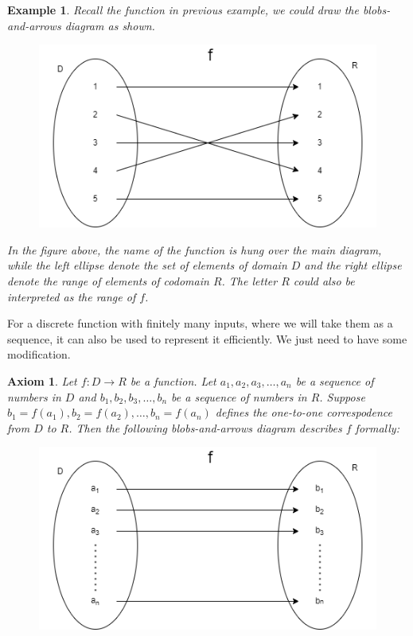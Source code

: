 \documentclass[12pt]{article}
\newtheorem*{example}{Example}
\newtheorem*{axiom}{Axiom}
\begin{document}
    \begin{example}
        Recall the function in previous example, we could draw the blobs-and-arrows diagram as shown. 

        \begin{figure}[H]
            \centering
            \includegraphics[scale=0.6]{blobs-and-arrows diagram.png}
        \end{figure}

        In the figure above, the name of the function is hung over the main diagram, while the left ellipse denote the set of elements of domain $D$ and the right ellipse denote the range of elements of codomain $R$. The letter $R$ could also be interpreted as the range of $f$.
    \end{example}

    For a discrete function with finitely many inputs, where we will take them as a sequence, it can also be used to represent it efficiently. We just need to have some modification.

    \begin{axiom}
        Let $f:D\to R$ be a function. Let $a_1,a_2,a_3,\dots,a_n$ be a sequence of numbers in $D$ and $b_1,b_2,b_3,\dots, b_n$ be a sequence of numbers in $R$. Suppose $b_1=f(a_1), b_2=f(a_2), \dots , b_n=f(a_n)$ defines the one-to-one correspodence from $D$ to $R$. Then the following blobs-and-arrows diagram describes $f$ formally:

        \begin{figure}[H]
            \centering
            \includegraphics[scale=0.6]{blobs-and-arrows diagram sequence.png}
        \end{figure}
    \end{axiom}
\end{document}
